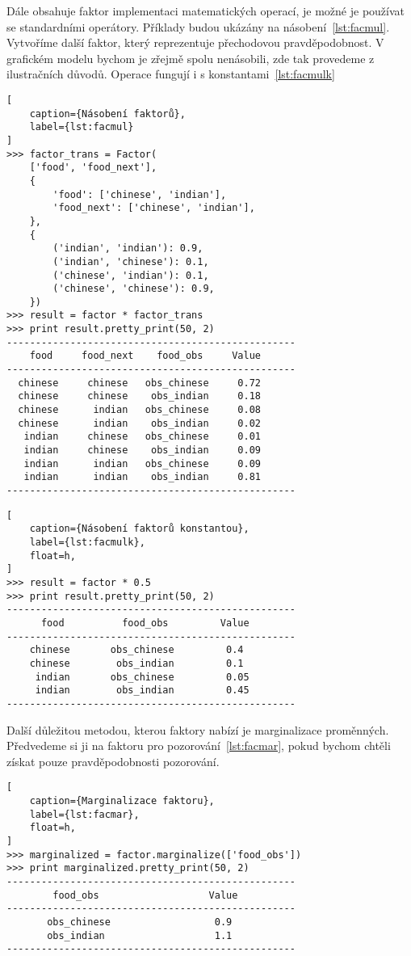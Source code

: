 Dále obsahuje faktor implementaci matematických operací, je možné je používat se standardními operátory. 
Příklady budou ukázány na násobení~\ref{lst:facmul}.
Vytvoříme další faktor, který reprezentuje přechodovou pravděpodobnost.
V grafickém modelu bychom je zřejmě spolu nenásobili, zde tak provedeme z ilustračních důvodů.
Operace fungují i s konstantami~\ref{lst:facmulk}

\begin{lstlisting}[
	caption={Násobení faktorů},
	label={lst:facmul}
]
>>> factor_trans = Factor(
    ['food', 'food_next'],
    {
        'food': ['chinese', 'indian'],
        'food_next': ['chinese', 'indian'],
    },
    {
		('indian', 'indian'): 0.9,
		('indian', 'chinese'): 0.1,
		('chinese', 'indian'): 0.1,
		('chinese', 'chinese'): 0.9,
    })
>>> result = factor * factor_trans
>>> print result.pretty_print(50, 2)
--------------------------------------------------
    food     food_next    food_obs     Value
--------------------------------------------------
  chinese     chinese   obs_chinese     0.72
  chinese     chinese    obs_indian     0.18
  chinese      indian   obs_chinese     0.08
  chinese      indian    obs_indian     0.02
   indian     chinese   obs_chinese     0.01
   indian     chinese    obs_indian     0.09
   indian      indian   obs_chinese     0.09
   indian      indian    obs_indian     0.81
--------------------------------------------------
\end{lstlisting}

\begin{lstlisting}[
	caption={Násobení faktorů konstantou},
	label={lst:facmulk},
	float=h,
]
>>> result = factor * 0.5
>>> print result.pretty_print(50, 2)
--------------------------------------------------
      food          food_obs         Value
--------------------------------------------------
    chinese       obs_chinese         0.4
    chinese        obs_indian         0.1
     indian       obs_chinese         0.05
     indian        obs_indian         0.45
--------------------------------------------------
\end{lstlisting}

Další důležitou metodou, kterou faktory nabízí je marginalizace proměnných.
Předvedeme si ji na faktoru pro pozorování~\ref{lst:facmar}, pokud bychom chtěli získat pouze pravděpodobnosti pozorování.
\begin{lstlisting}[
	caption={Marginalizace faktoru},
	label={lst:facmar},
	float=h,
]
>>> marginalized = factor.marginalize(['food_obs'])
>>> print marginalized.pretty_print(50, 2)
--------------------------------------------------
        food_obs                   Value
--------------------------------------------------
       obs_chinese                  0.9
       obs_indian                   1.1
--------------------------------------------------
\end{lstlisting}

